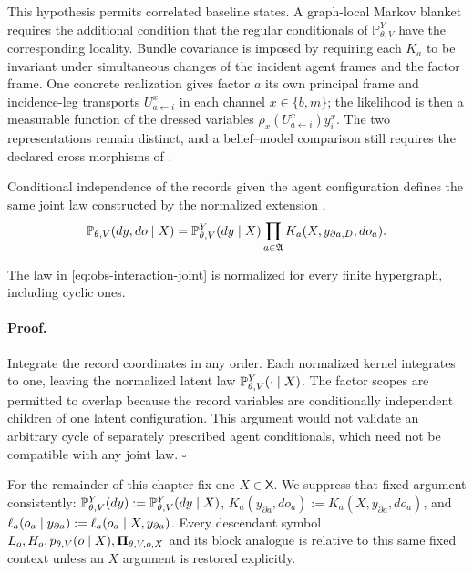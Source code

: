 This hypothesis permits correlated baseline states.  A graph-local Markov
blanket requires the additional condition that the regular conditionals of
\(\mathbb P_{\theta,V}^{Y}\) have the corresponding locality. Bundle covariance is imposed by
requiring each $K_a$ to be invariant under simultaneous changes of the
incident agent frames and the factor frame.  One concrete realization gives
factor $a$ its own principal frame and incidence-leg transports
$U^x_{a\leftarrow i}$ in each channel $x\in\{b,m\}$; the likelihood is then a
measurable function of the dressed variables
$\rho_x(U^x_{a\leftarrow i})y_i^x$.  The two representations remain distinct,
and a belief--model comparison still requires the declared cross morphisms of
.  

Conditional independence of the records given the agent configuration defines
the same joint law constructed by the normalized extension
,
\begin{equation}
\mathbb P_{\theta,V}(dy,do\mid X)
=\mathbb P_{\theta,V}^{Y}(dy\mid X)
\prod_{a\in\mathfrak A}
K_a(X,y_{\partial a,D},do_a).
\label{eq:obs-interaction-joint}
\end{equation}

The law in \eqref{eq:obs-interaction-joint} is normalized for every finite
hypergraph, including cyclic ones.  

\paragraph{Proof.}
Integrate the record coordinates in any order.  Each normalized kernel
integrates to one, leaving the normalized latent law
\(\mathbb P_{\theta,V}^{Y}(\cdot\mid X)\).
The factor scopes
are permitted to overlap because the record variables are conditionally independent
children of one latent configuration.  This argument would not validate an
arbitrary cycle of separately prescribed agent conditionals, which need not be
compatible with any joint law.  $\square$

For the remainder of this chapter fix one $X\in\mathsf X$.  We suppress that
fixed argument consistently:
\(\mathbb P_{\theta,V}^{Y}(dy):=
\mathbb P_{\theta,V}^{Y}(dy\mid X)\),
$K_a(y_{\partial a},do_a):=K_a(X,y_{\partial a},do_a)$, and
$\ell_a(o_a\mid y_{\partial a}):=
\ell_a(o_a\mid X,y_{\partial a})$.  Every descendant symbol
$L_o,H_o,p_{\theta,V}(o\mid X),
\boldsymbol\Pi_{\theta,V,o,X}$ and its block analogue is relative to this same fixed
context unless an $X$ argument is restored explicitly.

